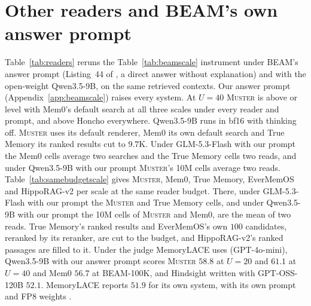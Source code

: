 \documentclass{article}
\newcommand{\sys}{\textsc{Muster}}
\begin{document}
\section{Other readers and BEAM's own answer prompt}\label{app:readers}

Table~\ref{tab:readers} reruns the Table~\ref{tab:beamscale} instrument under BEAM's answer prompt (Listing~44 of \cite{beam}, a
direct answer without explanation) and with the open-weight Qwen3.5-9B, on the same retrieved contexts. Our answer prompt (Appendix~\ref{app:beamscale})
raises every system. At $U{=}40$ \sys{} is above or level with Mem0's default search at all three scales under every reader and prompt, and above Honcho everywhere. Qwen3.5-9B runs in bf16 with thinking off. \sys{} uses its default renderer, Mem0 its own default search and True Memory its ranked results cut to $9.7$K. Under GLM-5.3-Flash with our prompt the Mem0 cells average two searches and the True Memory cells two reads, and under Qwen3.5-9B with our prompt \sys{}'s 10M cells average two reads. Table~\ref{tab:samebudgetscale} gives \sys{}, Mem0, True Memory, EverMemOS and HippoRAG-v2 per scale at the same reader budget. There, under GLM-5.3-Flash with our prompt the \sys{} and True Memory cells, and under Qwen3.5-9B with our prompt the 10M cells of \sys{} and Mem0, are the mean of two reads. True Memory's ranked results and EverMemOS's own $100$ candidates, reranked by its reranker, are cut to the budget, and HippoRAG-v2's ranked passages are filled to it.
Under the judge MemoryLACE uses (GPT-4o-mini), Qwen3.5-9B with our answer prompt scores \sys{} $58.8$ at $U{=}20$ and $61.1$ at $U{=}40$
and Mem0 $56.7$ at BEAM-100K, and Hindsight written with GPT-OSS-120B $52.1$. MemoryLACE reports $51.9$ for its own system, with its own prompt and FP8 weights \cite{memlace}.
\end{document}
